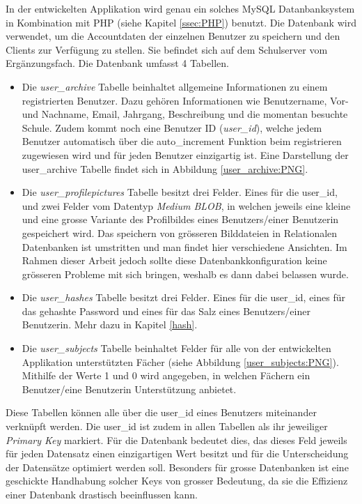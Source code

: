 \documentclass[a4paper,11pt]{report}
\begin{document}
				In der entwickelten Applikation wird genau ein solches MySQL Datanbanksystem in Kombination mit PHP (siehe Kapitel \ref{ssec:PHP}) benutzt. Die Datenbank wird verwendet, um die Accountdaten der einzelnen Benutzer zu speichern und den Clients zur Verfügung zu stellen. Sie befindet sich auf dem Schulserver vom Ergänzungsfach. Die Datenbank umfasst 4 Tabellen.
				
				\begin{itemize}
					\item Die \emph{user\_archive} Tabelle beinhaltet allgemeine Informationen zu einem registrierten Benutzer. Dazu gehören Informationen wie Benutzername, Vor- und Nachname, Email, Jahrgang, Beschreibung und die momentan besuchte Schule. Zudem kommt noch eine Benutzer ID (\emph{user\_id}), welche jedem Benutzer automatisch über die auto\_increment Funktion beim registrieren zugewiesen wird und für jeden Benutzer einzigartig ist. Eine Darstellung der user\_archive Tabelle findet sich in Abbildung \ref{user_archive:PNG}.
					\item Die \emph{user\_profilepictures} Tabelle besitzt drei Felder. Eines für die user\_id, und zwei Felder vom Datentyp \emph{Medium BLOB}, in welchen jeweils eine kleine und eine grosse Variante des Profilbildes eines Benutzers/einer Benutzerin gespeichert wird. Das speichern von grösseren Bilddateien in Relationalen Datenbanken ist umstritten und man findet hier verschiedene Ansichten. Im Rahmen dieser Arbeit jedoch sollte diese Datenbankkonfiguration keine grösseren Probleme mit sich bringen, weshalb es dann dabei belassen wurde.
					\item Die \emph{user\_hashes} Tabelle besitzt drei Felder. Eines für die user\_id, eines für das gehashte Password und eines für das Salz eines Benutzers/einer Benutzerin. Mehr dazu in Kapitel \ref{hash}.
					\item Die \emph{user\_subjects} Tabelle beinhaltet Felder für alle von der entwickelten Applikation unterstützten Fächer (siehe Abbildung \ref{user_subjects:PNG}). Mithilfe der Werte 1 und 0 wird angegeben, in welchen Fächern ein Benutzer/eine Benutzerin Unterstützung anbietet.
				\end{itemize}
			
				
				Diese Tabellen können alle über die user\_id eines Benutzers miteinander verknüpft werden. Die user\_id ist zudem in allen Tabellen als ihr jeweiliger \emph{Primary Key} markiert. Für die Datenbank bedeutet dies, das dieses Feld jeweils für jeden Datensatz einen einzigartigen Wert besitzt und für die Unterscheidung der Datensätze optimiert werden soll. Besonders für grosse Datenbanken ist eine geschickte Handhabung solcher Keys von grosser Bedeutung, da sie die Effizienz einer Datenbank drastisch beeinflussen kann.
				
\end{document}
